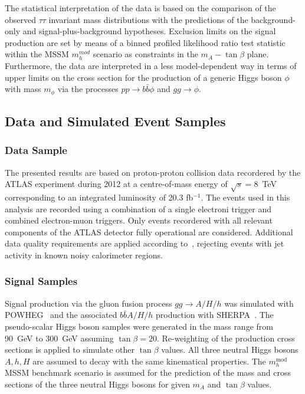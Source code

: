 The statistical interpretation of the data is based on the 
comparison of the observed $\tau\tau$ invariant mass distributions with the predictions of the  background-only and signal-plus-background
hypotheses. Exclusion limits on the signal production are set by means of a binned profiled likelihood ratio
test statistic within the MSSM $m_{h}^{mod}$ scenario as constraints in the 
 $m_A - \tan\beta$ plane. Furthermore, the data are interpreted in a less model-dependent
way in terms of  upper limits on the cross section for the production of a generic Higgs boson $\phi$ with   mass  $m_\phi$ 
via the  processes $pp \rightarrow b\bar{b}\phi$ and $gg \rightarrow \phi$.


 




\subsection{Data and Simulated Event Samples}
\label{sec:sample}
\subsubsection{Data Sample}

The  presented results  are based on proton-proton collision data
recordered by the ATLAS experiment during 2012 at a centre-of-mass energy of $\sqrt{s}=8$~TeV
corresponding to an integrated luminosity of 20.3 fb$^{-1}$.
The events used in this analysis are recorded using a combination of a
single electroni trigger  and combined electron-muon triggers. Only events 
recordered with  all  relevant components of the ATLAS detector 
fully operational are considered.
Additional data quality requirements are applied according to~\cite{ATLASCLEANING}, rejecting 
events %
with jet activity in known noisy calorimeter regions. 




\subsubsection{Signal Samples}
Signal production via the gluon fusion process $gg\rightarrow A/H/h$
was simulated with POWHEG~\cite{POWHEG} and the associated
$b\bar{b}A/H/h$ production with SHERPA~\cite{SHERPA}.  The
pseudo-scalar Higgs boson samples were generated in the mass range from
90~GeV to 300~GeV assuming $\tan\beta = 20$. Re-weighting of the production cross sections is applied 
to simulate other $\tan\beta$ values. All three  neutral Higgs bosons $A,h,H$ are assumed to decay 
with the same kinematical properties. The $m_h^{\mathrm{mod}}$ MSSM benchmark scenario is assumed
for the prediction of the mass and cross sections of the three neutral Higgs bosons for  given $m_A$ and $\tan\beta$ values.


